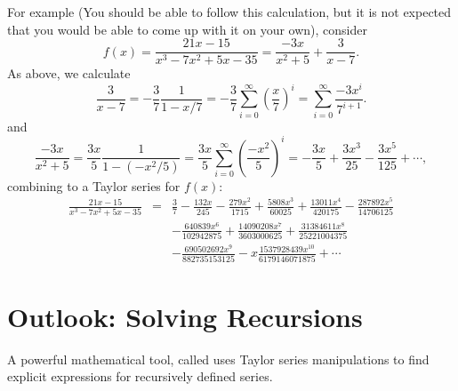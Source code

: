 For example (You should be able to follow this calculation, but it is not
expected that you would be able to come up with it on your own), consider
\[
f(x)=\frac{21x-15}{x^3-7x^2+5x-35}=\frac{-3x}{x^2+5}+\frac{3}{x-7}.
\]
As above, we calculate
\[
\frac{3}{x-7}=-\frac{3}{7}\frac{1}{1-x/7}=-\frac{3}{7}
\sum_{i=0}^\infty \left(\frac{x}{7}\right)^i
=\sum_{i=0}^\infty \frac{-3x^i}{7^{i+1}}.
\]
and
\[
\frac{-3x}{x^2+5}=\frac{3x}{5}\frac{1}{1-(-x^2/5)}=\frac{3x}{5}
\sum_{i=0}^\infty \left(\frac{-x^2}{5}\right)^i
=-\frac{3x}{5}
+\frac{3x^3}{25}
-\frac{3x^5}{125}+\cdots,
\]
combining to a Taylor series for $f(x)$:
\begin{eqnarray*}
\frac{21x-15}{x^3-7x^2+5x-35}&=&
\frac{3}{7}-\frac{132 x}{245}-\frac{279 x^{2}}{1715}+\frac{5808
x^{3}}{60025}+\frac{13011 x^{4}}{420175}-\frac{287892 x^{5}}{14706125}\\
&&-\frac{640839 x^{6}}{102942875}+\frac{14090208 x^{7}}{3603000625}
+\frac{31384611 x^{8}}{25221004375}\\
&&-\frac{690502692 x^{9}}{882735153125}-
x\frac{1537928439 x^{10}}{6179146071875}
+\cdots
\end{eqnarray*}


\section{Outlook: Solving Recursions}
\label{solvfibo}

A powerful mathematical tool, called  uses
Taylor series manipulations to find explicit expressions for recursively
defined series. 

